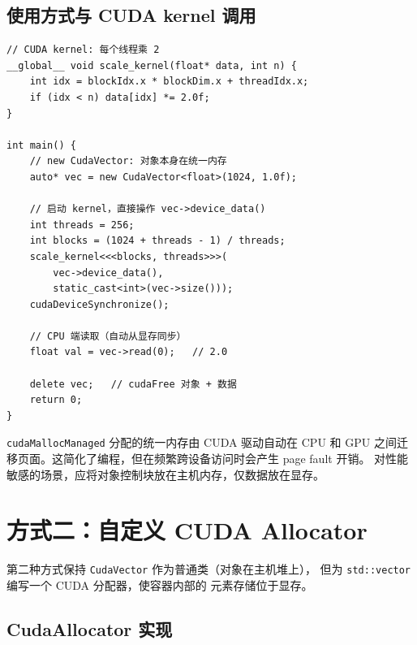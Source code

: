 \documentclass[12pt,a4paper,fontset=fandol]{ctexbook}
\begin{document}
\subsection{使用方式与 CUDA kernel 调用}

\begin{lstlisting}
// CUDA kernel: 每个线程乘 2
__global__ void scale_kernel(float* data, int n) {
    int idx = blockIdx.x * blockDim.x + threadIdx.x;
    if (idx < n) data[idx] *= 2.0f;
}

int main() {
    // new CudaVector: 对象本身在统一内存
    auto* vec = new CudaVector<float>(1024, 1.0f);

    // 启动 kernel，直接操作 vec->device_data()
    int threads = 256;
    int blocks = (1024 + threads - 1) / threads;
    scale_kernel<<<blocks, threads>>>(
        vec->device_data(),
        static_cast<int>(vec->size()));
    cudaDeviceSynchronize();

    // CPU 端读取（自动从显存同步）
    float val = vec->read(0);   // 2.0

    delete vec;   // cudaFree 对象 + 数据
    return 0;
}
\end{lstlisting}

\begin{note}[title=统一内存的代价]
\texttt{cudaMallocManaged} 分配的统一内存由 CUDA 驱动自动在 CPU 和 GPU
之间迁移页面。这简化了编程，但在频繁跨设备访问时会产生 page fault 开销。
对性能敏感的场景，应将对象控制块放在主机内存，仅数据放在显存。
\end{note}

\section{方式二：自定义 CUDA Allocator}

第二种方式保持 \texttt{CudaVector} 作为普通类（对象在主机堆上），
但为 \texttt{std::vector} 编写一个 CUDA 分配器，使容器内部的
元素存储位于显存。

\subsection{CudaAllocator 实现}
\end{document}
